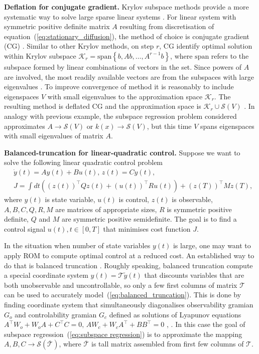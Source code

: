 \documentclass{article}
\begin{document}
\textbf{Deflation for conjugate gradient.} Krylov subspace methods provide a more systematic way to solve large sparse linear systems \cite{saad2003iterative}. For linear system with symmetric positive definite matrix $A$ resulting from discretisation of equation~(\ref{eq:stationary_diffusion}), the method of choice is conjugate gradient (CG) \cite{hestenes1952methods}. Similar to other Krylov methods, on step $r$, CG identify optimal solution within Krylov subspace $\mathcal{K}_{r} = \text{span}\left\{b, Ab, \dots, A^{r-1}b\right\}$, where $\text{span}$ refers to the subspace formed by linear combinations of vectors in the set. Since powers of $A$ are involved, the most readily available vectors are from the subspaces with large eigenvalues \cite{saad2011numerical}. To improve convergence of method it is reasonably to include eigenspaces $V$ with small eigenvalues to the approximation space $\mathcal{K}_{r}$. The resulting method is deflated CG and the approximation space is $\mathcal{K}_{r} \cup \mathcal{S}(V)$ \cite{saad2000deflated}. In analogy with previous example, the subspace regression problem considered approximates $A\rightarrow \mathcal{S}(V)$ or $k(x) \rightarrow \mathcal{S}(V)$, but this time $V$ spans eigenspaces with small eigenvalues of matrix $A$.

\textbf{Balanced-truncation for linear-quadratic control.} Suppose we want to solve the following linear quadratic control problem
\begin{equation}
	\label{eq:balanced_truncation}
	\begin{split}
	&\dot{y}(t) = A y(t) + B u(t),\,z(t) = C y(t),\\
	&J = \int dt \left(\left(z(t)\right)^\top Q z(t) + \left(u(t)\right)^\top R u(t)\right) + \left(z(T)\right)^\top M z(T),
	\end{split}
\end{equation}
where $y(t)$ is state variable, $u(t)$ is control, $z(t)$ is observable, $A, B, C, Q, R, M$ are matrices of appropriate sizes, $R$ is symmetric positive definite, $Q$ and $M$ are symmetric positive semidefinite. The goal is to find a control signal $u(t), t\in[0, T]$ that minimises cost function $J$.

In the situation when number of state variables $y(t)$ is large, one may want to apply ROM to compute optimal control at a reduced cost. An established way to do that is balanced truncation \cite{moore2003principal}. Roughly speaking, balanced truncation compute a special coordinate system $y(t) = \mathcal{T} \widetilde{y}(t)$ that discounts variables that are both unobservable and uncontrollable, so only a few first columns of matrix $\mathcal{T}$ can be used to accurately model~(\ref{eq:balanced_truncation}). This is done by finding coordinate system that simultaneously diagonalises observability gramian $G_o$ and controlability gramian $G_c$ defined as solutions of Lyapunov equations $A^\top W_o + W_o A + C^\top C = 0,\,AW_c + W_c A^\top + B B^\top = 0$ \cite{moore2003principal}, \cite{volkwein2013proper}. In this case the goal of subspace regression~(\ref{eq:subspace regression}) is to approximate the mapping $A, B, C \rightarrow \mathcal{S}\left(\overline{\mathcal{T}}\right)$, where $\overline{\mathcal{T}}$ is tall matrix assembled from first few columns of $\mathcal{T}$.
\end{document}
